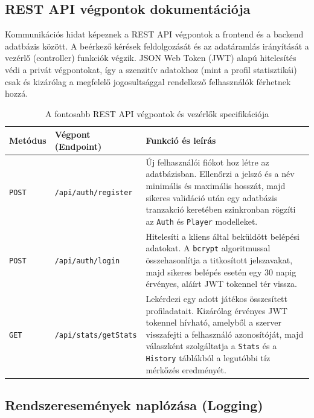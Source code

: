 \subsection{REST API végpontok dokumentációja}
\label{subsec:api_docs}

Kommunikációs hidat képeznek a REST API végpontok a frontend és a backend adatbázis között. A beérkező kérések feldolgozását és az adatáramlás irányítását a vezérlő (controller) funkciók végzik. JSON Web Token (JWT) \cite{jsonwebtoken} alapú hitelesítés védi a privát végpontokat, így a szenzitív adatokhoz (mint a profil statisztikái) csak és kizárólag a megfelelő jogosultsággal rendelkező felhasználók férhetnek hozzá.


\begin{table}[H]
    \centering
    \begin{tabular}{| p{} | p{} | p{} |}
        \hline
        \textbf{Metódus} & \textbf{Végpont (Endpoint)} & \textbf{Funkció és leírás} \\
        \hline
        \texttt{POST} & \texttt{/api/auth/register} & Új felhasználói fiókot hoz létre az adatbázisban. Ellenőrzi a jelszó és a név minimális és maximális hosszát, majd sikeres validáció után egy adatbázis tranzakció keretében szinkronban rögzíti az \texttt{Auth} és \texttt{Player} modelleket. \\
        \hline
        \texttt{POST} & \texttt{/api/auth/login} & Hitelesíti a kliens által beküldött belépési adatokat. A \texttt{bcrypt} algoritmussal összehasonlítja a titkosított jelszavakat, majd sikeres belépés esetén egy 30 napig érvényes, aláírt JWT tokennel tér vissza. \\
        \hline
        \texttt{GET} & \texttt{/api/stats/getStats} & Lekérdezi egy adott játékos összesített profiladatait. Kizárólag érvényes JWT tokennel hívható, amelyből a szerver visszafejti a felhasználó azonosítóját, majd válaszként szolgáltatja a \texttt{Stats} és a \texttt{History} táblákból a legutóbbi tíz mérkőzés eredményét. \\
        \hline
    \end{tabular}
    \caption{A fontosabb REST API végpontok és vezérlők specifikációja}
    \label{tab:api_endpoints}
\end{table}

\subsection{Rendszeresemények naplózása (Logging)}
\label{subsec:logging}

